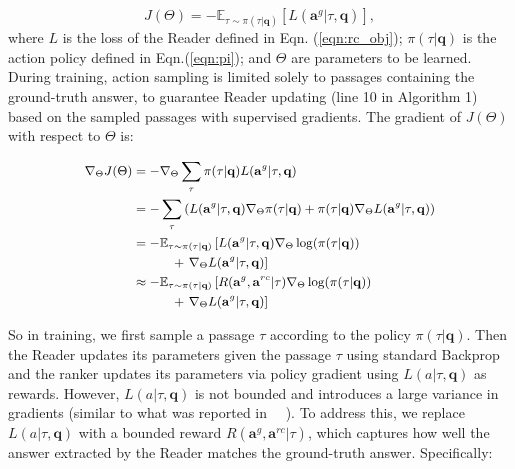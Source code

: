 \documentclass[letterpaper]{article} \usepackage{aaai18}  \usepackage{times}  \usepackage{helvet}  \usepackage{courier}  \usepackage{url}  \usepackage{graphicx}  \usepackage{comment}
\begin{document}
\begin{equation}
J(\Theta)=
-\mathbb{E}_{\tau  \sim \pi (\tau | \mathbf{q} )} \left[ L(\mathbf{a}^g|\tau, \mathbf{q})\right],
\end{equation}
where $L$ is the loss of the Reader defined in Eqn. (\ref{eqn:rc_obj}); $\pi (\tau | \mathbf{q})$ is the action policy defined in Eqn.(\ref{eqn:pi});  and $\Theta$ are parameters to be learned.
During training, action sampling is limited solely to passages containing the ground-truth answer, to guarantee Reader updating (line 10 in Algorithm 1) based on the sampled passages with supervised gradients. The gradient of $J(\Theta)$ with respect to $\Theta$ is: 


\begin{equation}
\small
\begin{split}
\nabla_{\Theta}  J(\Theta) 
&= -\nabla_{\Theta} \sum_{\tau}  \pi(\tau|\mathbf{q}) L (\mathbf{a}^g | \tau, \mathbf{q}) \\
&=  - \sum_{\tau} \left( L(\mathbf{a}^g | \tau, \mathbf{q}) \nabla_{\Theta} \pi(\tau|\mathbf{q})  + \pi(\tau|\mathbf{q}) \nabla_{\Theta} L (\mathbf{a}^g | \tau, \mathbf{q}) \right) \\
&= - \mathbb{E}_{\tau  \sim \pi(\tau|\mathbf{q})}\left[ L (\mathbf{a}^g | \tau, \mathbf{q}) \nabla_{\Theta}\log(\pi(\tau|\mathbf{q})) \right. \\
&\quad\quad\quad + \left. \nabla_{\Theta} L (\mathbf{a}^g | \tau, \mathbf{q}) \right]\\
&\approx - \mathbb{E}_{\tau  \sim \pi(\tau|\mathbf{q})}\left[ R (\mathbf{a}^g,\mathbf{a}^{rc} | \tau) \nabla_{\Theta} \log(\pi(\tau|\mathbf{q})) \right. \\
&\quad \quad \quad + \left. \nabla_{\Theta} L (\mathbf{a}^g | \tau, \mathbf{q}) \right]
\label{eqn:rl_obj}
\end{split}
\normalsize
\end{equation}

So in training, we first sample a passage $\tau$ according to the policy $\pi (\tau | \mathbf{q})$. Then the Reader updates its parameters given the passage $\tau$ using standard Backprop and the ranker updates its parameters via policy gradient using $L(a|\tau,\mathbf{q})$ as rewards. However, $L(a|\tau,\mathbf{q})$ is not bounded and introduces a large variance in gradients (similar to what was reported in ~\citeauthor{mnih2014recurrent}~\citeyear{mnih2014recurrent}). To address this, we replace $L(a|\tau,\mathbf{q})$ with a bounded reward $R(\mathbf{a}^g,\mathbf{a}^{rc}|\tau)$, which captures how well the answer extracted by the Reader matches the ground-truth answer.  Specifically:
\end{document}
